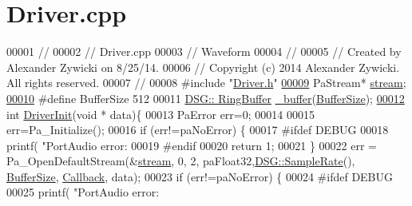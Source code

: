 \hypertarget{_driver_8cpp_source}{\section{Driver.\+cpp}
\label{_driver_8cpp_source}
}

\begin{DoxyCode}
00001 \textcolor{comment}{//}
00002 \textcolor{comment}{//  Driver.cpp}
00003 \textcolor{comment}{//  Waveform}
00004 \textcolor{comment}{//}
00005 \textcolor{comment}{//  Created by Alexander Zywicki on 8/25/14.}
00006 \textcolor{comment}{//  Copyright (c) 2014 Alexander Zywicki. All rights reserved.}
00007 \textcolor{comment}{//}
00008 \textcolor{preprocessor}{#include "\hyperlink{_driver_8h}{Driver.h}"}
\hypertarget{_driver_8cpp_source_l00009}{}\hyperlink{_driver_8cpp_aa2fbdaf8db29dee4b723a45b890cd92a}{00009} PaStream* \hyperlink{_driver_8cpp_aa2fbdaf8db29dee4b723a45b890cd92a}{stream};
\hypertarget{_driver_8cpp_source_l00010}{}\hyperlink{_driver_8cpp_aa362edf6db9662acf6ef958a6db19c35}{00010} \textcolor{preprocessor}{#define BufferSize 512}
00011 \hyperlink{class_d_s_g_1_1_ring_buffer}{DSG:: RingBuffer} \hyperlink{_driver_8cpp_acce4d24812914a6b276156d1a3d3e851}{\_buffer}(\hyperlink{_driver_8cpp_aa362edf6db9662acf6ef958a6db19c35}{BufferSize});
\hypertarget{_driver_8cpp_source_l00012}{}\hyperlink{_driver_8h_a70105fa3a575041357534257c1bd91a7}{00012} \textcolor{keywordtype}{int} \hyperlink{_driver_8cpp_a70105fa3a575041357534257c1bd91a7}{DriverInit}(\textcolor{keywordtype}{void} * data)\{
00013     PaError err=0;
00014     
00015     err=Pa\_Initialize();
00016     \textcolor{keywordflow}{if} (err!=paNoError) \{
00017 \textcolor{preprocessor}{#ifdef DEBUG}
00018         printf(  \textcolor{stringliteral}{"PortAudio error: %
00019 \textcolor{preprocessor}{#endif}
00020         \textcolor{keywordflow}{return} 1;
00021     \}
00022     err = Pa\_OpenDefaultStream(&\hyperlink{_driver_8cpp_aa2fbdaf8db29dee4b723a45b890cd92a}{stream}, 0, 2, paFloat32,\hyperlink{namespace_d_s_g_a72df05177db0412c3590070923f62819}{DSG::SampleRate}(),
      \hyperlink{_driver_8cpp_aa362edf6db9662acf6ef958a6db19c35}{BufferSize}, \hyperlink{_driver_8cpp_a110986770da2cd49dcf3789f8cc09c28}{Callback}, data);
00023     \textcolor{keywordflow}{if} (err!=paNoError) \{
00024 \textcolor{preprocessor}{#ifdef DEBUG}
00025         printf(  \textcolor{stringliteral}{"PortAudio error: %
}}
\end{DoxyCode}
